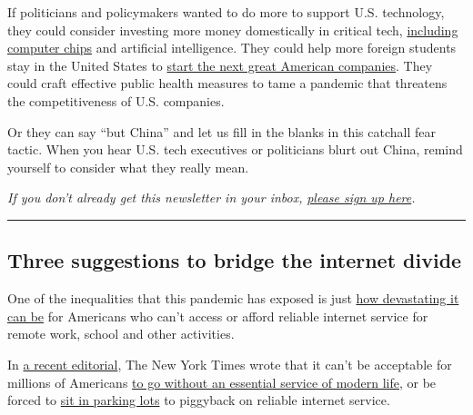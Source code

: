 If politicians and policymakers wanted to do more to support U.S.
technology, they could consider investing more money domestically in
critical tech,
\href{https://www.nytimes3xbfgragh.onion/2020/05/14/technology/trump-tsmc-us-chip-facility.html}{including
computer chips} and artificial intelligence. They could help more
foreign students stay in the United States to
\href{https://www.theatlantic.com/business/archive/2018/06/trump-immigrant-entrepreneurs/561989/}{start
the next great American companies}. They could craft effective public
health measures to tame a pandemic that threatens the competitiveness of
U.S. companies.

Or they can say ``but China'' and let us fill in the blanks in this
catchall fear tactic. When you hear U.S. tech executives or politicians
blurt out China, remind yourself to consider what they really mean.

\emph{If you don't already get this newsletter in your inbox,}
\href{https://www.nytimes3xbfgragh.onion/newsletters/signup/OT}{\emph{please
sign up here}}\emph{.}

\begin{center}\rule{0.5\linewidth}{\linethickness}\end{center}

\hypertarget{three-suggestions-to-bridge-the-internet-divide}{%
\subsection{Three suggestions to bridge the internet
divide}\label{three-suggestions-to-bridge-the-internet-divide}}

One of the inequalities that this pandemic has exposed is just
\href{https://www.nytimes3xbfgragh.onion/2020/06/05/us/coronavirus-education-lost-learning.html}{how
devastating it can be} for Americans who can't access or afford reliable
internet service for remote work, school and other activities.

In
\href{https://www.nytimes3xbfgragh.onion/2020/07/18/opinion/sunday/broadband-internet-access-civil-rights.html}{a
recent editorial}, The New York Times wrote that it can't be acceptable
for millions of Americans
\href{https://www.nytimes3xbfgragh.onion/2020/07/18/opinion/sunday/broadband-internet-access-civil-rights.html}{to
go without an essential service of modern life}, or be forced to
\href{https://www.nytimes3xbfgragh.onion/2020/05/05/technology/parking-lots-wifi-coronavirus.html}{sit
in parking lots} to piggyback on reliable internet service.

